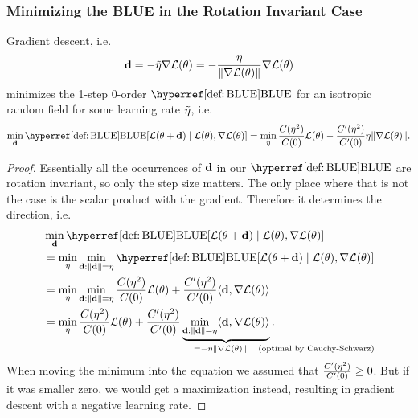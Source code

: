 \subsubsection{Minimizing the BLUE in the Rotation Invariant Case}

\begin{corollary}
	Gradient descent, i.e.
	\begin{equation*}
		\mathbf{d} = - \tilde{\eta} \nabla\mathcal{L}(\theta)
		= - \frac{\eta}{\|\nabla\mathcal{L}(\theta)\|} \nabla\mathcal{L}(\theta)
	\end{equation*}
	minimizes the 1-step 0-order \(\BLUE\) for an isotropic random
	field for some learning rate \(\tilde{\eta}\), i.e.
	\begin{equation*}
		\min_{\step}
		\BLUE[\Loss(\param + \step)\mid \Loss(\param), \nabla\Loss(\param)]
		= \min_{\lr} \frac{\iC(\lr^2)}{\iC(0)} \Loss(\param)
		- \frac{\iC'(\lr^2)}{\iC'(0)} \lr \|\nabla\Loss(\param)\|.
	\end{equation*}
\end{corollary}
\begin{proof}
	Essentially all the occurrences of \(\mathbf{d}\) in our \(\BLUE\) are
	rotation invariant, so only the step size matters. The only place where that
	is not the case is the scalar product with the gradient. Therefore it
	determines the direction, i.e.
	\begin{align*}
		&\min_{\step}
		\BLUE[\Loss(\param + \step)\mid \Loss(\param), \nabla\Loss(\param)]\\
		&= \min_{\lr}\min_{\step:\|\step\|=\lr}
		\BLUE[\Loss(\param + \step)\mid \Loss(\param), \nabla\Loss(\param)]\\
		&= \min_{\lr}\min_{\step:\|\step\|=\lr}
		\frac{\iC(\lr^2)}{\iC(0)} \Loss(\param)
		+ \frac{\iC'(\lr^2)}{\iC'(0)} \langle \step, \nabla\Loss(\param)\rangle\\
		&= \min_{\lr}
		\frac{\iC(\lr^2)}{\iC(0)} \Loss(\param)
		+ \frac{\iC'(\lr^2)}{\iC'(0)}
		\underbrace{\min_{\step:\|\step\|=\lr}\langle \step, \nabla\Loss(\param)\rangle}_{
			= -\eta \|\nabla \Loss(\param)\| \quad \mathrlap{\text{(optimal by Cauchy-Schwarz)}}
		}.\hphantom{\text{by Cauchy-Schwarz}}
	\end{align*}
	When moving the minimum into the equation we assumed that
	\(\frac{C'(\eta^2)}{C'(0)}\ge 0\). But if it was smaller zero, we would get a
	maximization instead, resulting in gradient descent with a negative learning
	rate.
\end{proof}





